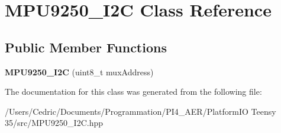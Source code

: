 \hypertarget{class_m_p_u9250___i2_c}{}\section{M\+P\+U9250\+\_\+\+I2C Class Reference}
\label{class_m_p_u9250___i2_c}
\subsection*{Public Member Functions}
\begin{DoxyCompactItemize}
\item 
\mbox{\label{class_m_p_u9250___i2_c_aae3d565d07986146d414594ddda9b43a}} 
{\bfseries M\+P\+U9250\+\_\+\+I2C} (uint8\+\_\+t mux\+Address)
\end{DoxyCompactItemize}


The documentation for this class was generated from the following file\+:\begin{DoxyCompactItemize}
\item 
/\+Users/\+Cedric/\+Documents/\+Programmation/\+P\+I4\+\_\+\+A\+E\+R/\+Platform\+I\+O Teensy 35/src/M\+P\+U9250\+\_\+\+I2\+C.\+hpp\end{DoxyCompactItemize}
